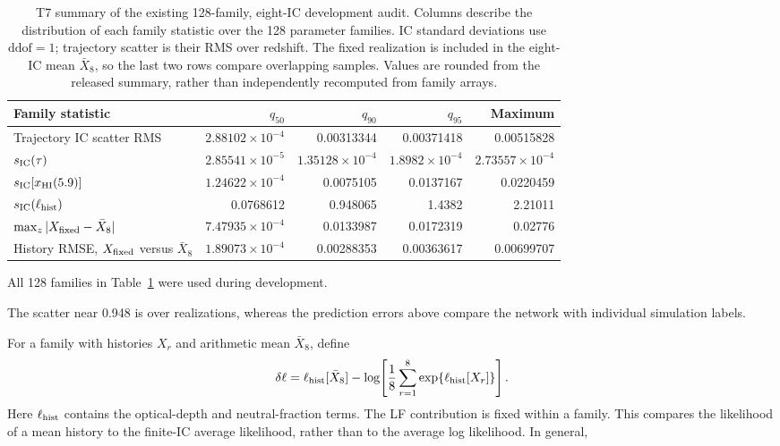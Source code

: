 \begin{table}[t]\centering\small
\caption{T7 summary of the existing 128-family, eight-IC development audit. Columns describe the distribution of each family statistic over the 128 parameter families. IC standard deviations use $\mathrm{ddof}=1$; trajectory scatter is their RMS over redshift. The fixed realization is included in the eight-IC mean $\bar X_8$, so the last two rows compare overlapping samples. Values are rounded from the released summary, rather than independently recomputed from family arrays.}\label{tab:t7-ic-summary}
\begin{tabular*}{\textwidth}{@{\extracolsep{\fill}}lrrrr}\toprule
Family statistic & $q_{50}$ & $q_{90}$ & $q_{95}$ & Maximum\\\midrule
Trajectory IC scatter RMS & $2.88102\times10^{-4}$ & 0.00313344 & 0.00371418 & 0.00515828\\
$s_{\rm IC}(\tau)$ & $2.85541\times10^{-5}$ & $1.35128\times10^{-4}$ & $1.8982\times10^{-4}$ & $2.73557\times10^{-4}$\\
$s_{\rm IC}[x_{\rm HI}(5.9)]$ & $1.24622\times10^{-4}$ & 0.0075105 & 0.0137167 & 0.0220459\\
$s_{\rm IC}(\ell_{\rm hist})$ & 0.0768612 & 0.948065 & 1.4382 & 2.21011\\
$\max_z|X_{\rm fixed}-\bar X_8|$ & $7.47935\times10^{-4}$ & 0.0133987 & 0.0172319 & 0.02776\\
History RMSE, $X_{\rm fixed}$ versus $\bar X_8$ & $1.89073\times10^{-4}$ & 0.00288353 & 0.00363617 & 0.00699707\\
\bottomrule\end{tabular*}\end{table}

All 128 families in Table~\ref{tab:t7-ic-summary} were used during development.

The scatter near 0.948 is over realizations, whereas the prediction errors above compare the network with individual simulation labels.

For a family with histories $X_r$ and arithmetic mean $\bar X_8$, define
\begin{equation}
\delta\ell=\ell_{\rm hist}[\bar X_8]
-\log\!\left[\frac{1}{8}\sum_{r=1}^{8}\exp\{\ell_{\rm hist}[X_r]\}\right].
\label{eq:t7-target-difference}
\end{equation}
Here $\ell_{\rm hist}$ contains the optical-depth and neutral-fraction terms. The LF contribution is fixed within a family. This compares the likelihood of a mean history to the finite-IC average likelihood, rather than to the average log likelihood. In general,

